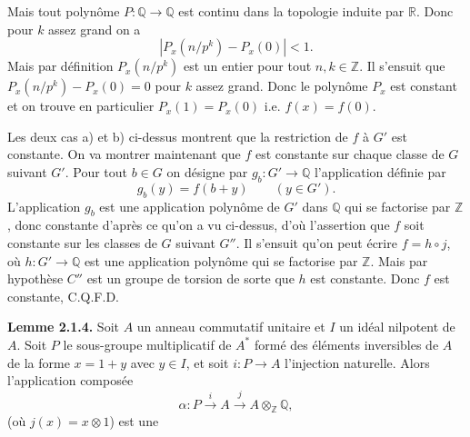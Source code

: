 Mais tout polynôme $P:\mathbb Q\to\mathbb Q$ est continu dans la topologie induite par $\mathbb R$. Donc pour $k$ assez grand on a
\[
|P_x(n/p^k)-P_x(0)|<1.
\]
Mais par définition $P_x(n/p^k)$ est un entier pour tout $n,k\in\mathbb Z$. Il s'ensuit que $P_x(n/p^k)-P_x(0)=0$ pour $k$ assez grand. Donc le polynôme $P_x$ est constant et on trouve en particulier $P_x(1)=P_x(0)$ i.e. $f(x)=f(0)$.

Les deux cas a) et b) ci-dessus montrent que la restriction de $f$ à $G'$ est constante. On va montrer maintenant que $f$ est constante sur chaque classe de $G$ suivant $G'$. Pour tout $b\in G$ on désigne par $g_b:G'\to\mathbb Q$ l'application définie par
\[
g_b(y)=f(b+y)\qquad(y\in G').
\]
L'application $g_b$ est une application polynôme de $G'$ dans $\mathbb Q$ qui se factorise par $\mathbb Z$, donc constante d'après ce qu'on a vu ci-dessus, d'où l'assertion que $f$ soit constante sur les classes de $G$ suivant $G''$. Il s'ensuit qu'on peut écrire $f=h\circ j$, où $h:G'\to\mathbb Q$ est une application polynôme qui se factorise par $\mathbb Z$. Mais par hypothèse $C''$ est un groupe de torsion de sorte que $h$ est constante. Donc $f$ est constante, C.Q.F.D.

\textbf{Lemme 2.1.4.} Soit $A$ un anneau commutatif unitaire et $I$ un idéal nilpotent de $A$. Soit $P$ le sous-groupe multiplicatif de $A^*$ formé des éléments inversibles de $A$ de la forme $x=1+y$ avec $y\in I$, et soit $i:P\to A$ l'injection naturelle. Alors l'application composée
\[
\alpha:P\xrightarrow{i}A\xrightarrow{j}A\otimes_{\mathbb Z}\mathbb Q,
\]
(où $j(x)=x\otimes1$) est une
